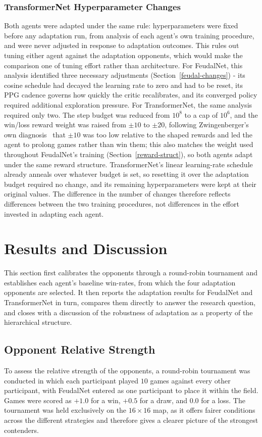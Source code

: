 \documentclass[sigconf,review=false]{acmart}
\begin{document}
\subsubsection{TransformerNet Hyperparameter Changes}
Both agents were adapted under the same rule: hyperparameters were
fixed before any adaptation run, from analysis of each agent's own
training procedure, and were never adjusted in response to
adaptation outcomes. This rules out tuning either agent against the
adaptation opponents, which would make the comparison one of
tuning effort rather than architecture. For FeudalNet, this
analysis identified three necessary adjustments (Section~\ref{feudal-changes}) -
its cosine schedule had decayed the learning rate to zero and had
to be reset, its PPG cadence governs how quickly the critic
recalibrates, and its converged policy required additional
exploration pressure. For TransformerNet, the same analysis
required only two. The step budget was reduced from $10^{8}$ to a
cap of $10^{6}$, and the win/loss reward weight was raised from
$\pm 10$ to $\pm 20$, following Zwingenberger's own
diagnosis~\cite{transformernet} that $\pm 10$ was too low relative
to the shaped rewards and led the agent to prolong games rather
than win them; this also matches the weight used throughout
FeudalNet's training (Section~\ref{reward-struct}), so both agents adapt under
the same reward structure. TransformerNet's linear learning-rate
schedule already anneals over whatever budget is set, so resetting
it over the adaptation budget required no change, and its
remaining hyperparameters were kept at their original values. The
difference in the number of changes therefore reflects differences
between the two training procedures, not differences in the effort
invested in adapting each agent.

\section{Results and Discussion}
This section first calibrates the opponents through a round-robin
tournament and establishes each agent's baseline win-rates, from
which the four adaptation opponents are selected. It then reports
the adaptation results for FeudalNet and TransformerNet in turn,
compares them directly to answer the research question, and closes
with a discussion of the robustness of adaptation as a property of
the hierarchical structure.
\label{results}

\subsection{Opponent Relative Strength}
\label{rr}
To assess the relative strength of the opponents, a round-robin tournament was conducted in which each participant played $10$ games against every other participant, with FeudalNet entered as one participant to place it within the field. 
Games were scored as $+1.0$ for a win, $+0.5$ for a draw, and $0.0$ for a loss. The tournament was held exclusively on the $16 \times 16$ map, as it offers fairer conditions across the different strategies and therefore gives a clearer picture of the strongest contenders.
\end{document}
